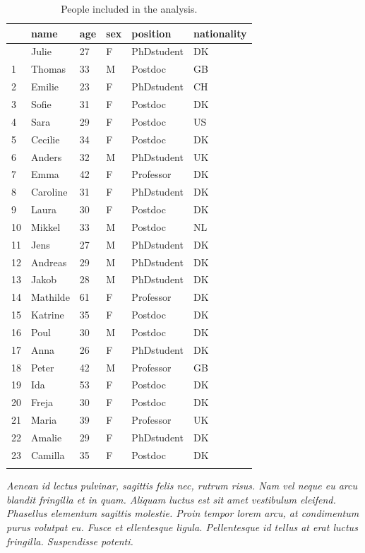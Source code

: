\documentclass[
  a4paper,
]{scrbook}
\begin{document}
\begin{longtable}[]{@{}llllll@{}}

\toprule\noalign{}
& name & age & sex & position & nationality \\
\midrule\noalign{}
\endhead
\bottomrule\noalign{}
\endlastfoot
0 & Julie & 27 & F & PhDstudent & DK \\
1 & Thomas & 33 & M & Postdoc & GB \\
2 & Emilie & 23 & F & PhDstudent & CH \\
3 & Sofie & 31 & F & Postdoc & DK \\
4 & Sara & 29 & F & Postdoc & US \\
5 & Cecilie & 34 & F & Postdoc & DK \\
6 & Anders & 32 & M & PhDstudent & UK \\
7 & Emma & 42 & F & Professor & DK \\
8 & Caroline & 31 & F & PhDstudent & DK \\
9 & Laura & 30 & F & Postdoc & DK \\
10 & Mikkel & 33 & M & Postdoc & NL \\
11 & Jens & 27 & M & PhDstudent & DK \\
12 & Andreas & 29 & M & PhDstudent & DK \\
13 & Jakob & 28 & M & PhDstudent & DK \\
14 & Mathilde & 61 & F & Professor & DK \\
15 & Katrine & 35 & F & Postdoc & DK \\
16 & Poul & 30 & M & Postdoc & DK \\
17 & Anna & 26 & F & PhDstudent & DK \\
18 & Peter & 42 & M & Professor & GB \\
19 & Ida & 53 & F & Postdoc & DK \\
20 & Freja & 30 & F & Postdoc & DK \\
21 & Maria & 39 & F & Professor & UK \\
22 & Amalie & 29 & F & PhDstudent & DK \\
23 & Camilla & 35 & F & Postdoc & DK \\


\caption{\label{tbl-subjects}People included in the analysis.}

\tabularnewline
\end{longtable}

\emph{Aenean id lectus pulvinar, sagittis felis nec, rutrum risus. Nam
vel neque eu arcu blandit fringilla et in quam. Aliquam luctus est sit
amet vestibulum eleifend. Phasellus elementum sagittis molestie. Proin
tempor lorem arcu, at condimentum purus volutpat eu. Fusce et
ellentesque ligula. Pellentesque id tellus at erat luctus fringilla.
Suspendisse potenti.}
\end{document}
